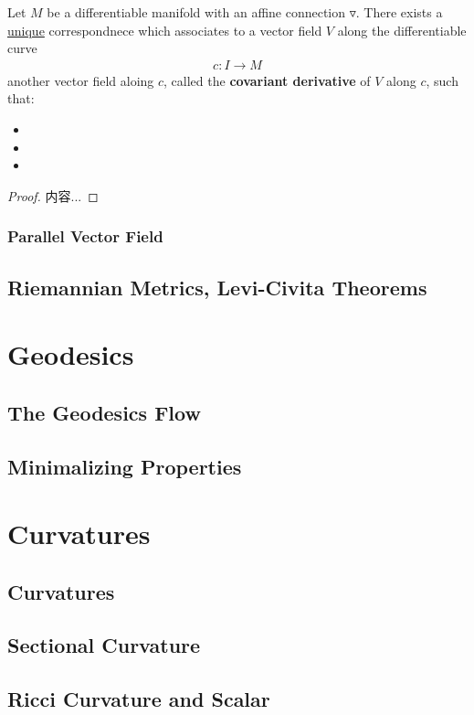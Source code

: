 \documentclass[Total.tex]{subfiles}
\begin{document}
			\begin{proposition}
				Let $M$ be a differentiable manifold with an affine connection $\triangledown$. There exists a \underline{unique} correspondnece which associates to a vector field $V$ along the differentiable curve
				\begin{gather*}
					c:I\rightarrow M
				\end{gather*}
				another vector field aloing $c$, called the \textbf{covariant derivative} of $V$ along $c$, such that:
				\begin{itemize}
					\item 
					\item 
					\item 
				\end{itemize}
			\end{proposition}
			\begin{proof}
				内容...
			\end{proof}
			\subsection{Parallel Vector Field}
		\section{Riemannian Metrics, Levi-Civita Theorems}
	\chapter{Geodesics}
		\section{The Geodesics Flow}
		\section{Minimalizing Properties}
	\chapter{Curvatures}
		\section{Curvatures}
		\section{Sectional Curvature}
		\section{Ricci Curvature and Scalar}
\end{document}
